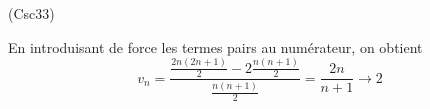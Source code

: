 \begin{tiny}(Csc33)\end{tiny} En introduisant de force les termes pairs au numérateur, on obtient
\[
v_n
= \frac{\frac{2n(2n+1)}{2} -2\frac{n(n+1)}{2}}{\frac{n(n+1)}{2}}
=\frac{2n}{n+1} \rightarrow 2
\]
